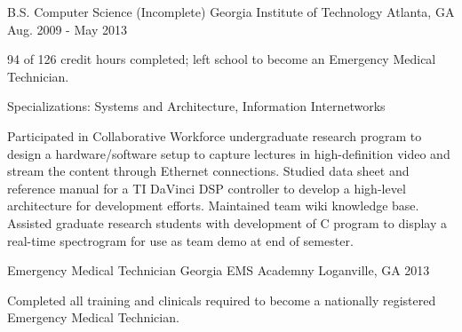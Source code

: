 

\begin{cventries}

  \cventry
    {B.S. Computer Science (Incomplete)} %
    {Georgia Institute of Technology} %
    {Atlanta, GA} %
    {Aug. 2009 - May 2013} %
    {
      \begin{cvitems} %
        \item {94 of 126 credit hours completed; left school to become an Emergency Medical Technician.}
        \item {Specializations: Systems and Architecture,  Information Internetworks}
        \item {Participated in Collaborative Workforce undergraduate research program to design a hardware/software setup to capture lectures in high-definition video and stream the content through Ethernet connections. Studied data sheet and reference manual for a TI DaVinci DSP controller to develop a high-level architecture for development efforts. Maintained team wiki knowledge base. Assisted graduate research students with development of C program to display a real-time spectrogram for use as team demo at end of semester.}
      \end{cvitems}
    }

  \cventry
  {Emergency Medical Technician} %
    {Georgia EMS Academny} %
    {Loganville, GA} %
    {2013} %
    {
      \begin{cvitems} %
        \item {Completed all training and clinicals required to become a nationally registered Emergency Medical Technician.}
      \end{cvitems}
    }
  

\end{cventries}
